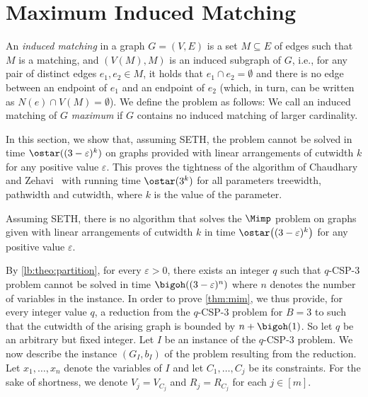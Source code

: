 \documentclass[a4paper,UKenglish,cleveref, autoref, thm-restate]{lipics-v2021}
\begin{document}
\section{Maximum Induced Matching}\label{sec:mim}

An \emph{induced matching} in a graph $G=(V,E)$ is a set $M\subseteq E$ of edges such that $M$ is a matching, and $(V(M), M)$ is an induced subgraph of $G$, i.e., for any pair of distinct edges $e_1, e_2\in M$, it holds that $e_1\cap e_2 = \emptyset$ and there is no edge between an endpoint of $e_1$ and an endpoint of $e_2$ (which, in turn, can be written as $N(e) \cap V(M) = \emptyset$). 
We define the \Mimp problem as follows:
We call an induced matching of $G$ \emph{maximum} if $G$ contains no induced matching of larger cardinality.

In this section, we show that, assuming SETH, the \Mimp problem cannot be solved in time $\ostar((3-\varepsilon)^{k})$ on graphs provided with linear arrangements of cutwidth $k$ for any positive value $\varepsilon$. 
This proves the tightness of the algorithm of Chaudhary and Zehavi~\cite{DBLP:conf/wg/ChaudharyZ23a} with running time $\ostar(3^k)$ for all parameters treewidth, pathwidth and cutwidth, where $k$ is the value of the parameter.

\begin{theorem}\label{thm:mim}
    Assuming SETH, there is no algorithm that solves the $\Mimp$ problem on graphs given with linear arrangements of cutwidth $k$ in time $\ostar\big((3-\varepsilon)^{k}\big)$ for any positive value $\varepsilon$.
\end{theorem}

By \cref{lb:theo:partition}, for every $\varepsilon > 0$, there exists an integer $q$ such that $q$-CSP-$3$ problem cannot be solved in time $\bigoh((3-\varepsilon)^n)$ where $n$ denotes the number of variables in the instance. 
In order to prove \cref{thm:mim}, we thus provide, for every integer value $q$, a reduction from the $q$-CSP-$3$ problem for $B=3$ to \Mimp such that the cutwidth of the arising graph is bounded by $n + \bigoh(1)$. 
So let $q$ be an arbitrary but fixed integer.
Let $I$ be an instance of the $q$-CSP-$3$ problem.
We now describe the instance $(G_I, b_I)$ of the \Mimp problem resulting from the reduction.  
Let $x_1,\dots, x_n$ denote the variables of $I$ and let $C_1,\dots, C_j$ be its constraints. For the sake of shortness, we denote $V_j = V_{C_j}$ and $R_j = R_{C_j}$ for each $j\in[m]$.
\end{document}
